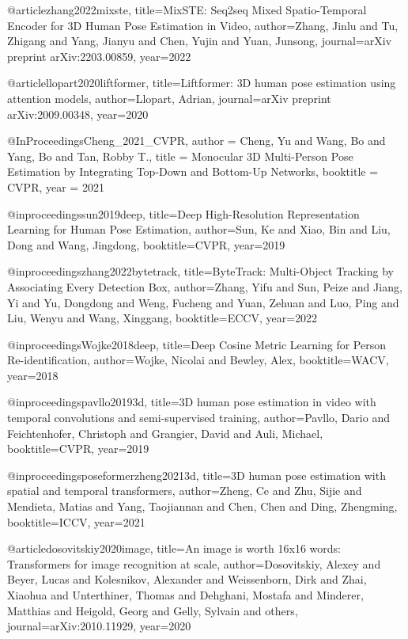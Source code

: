 @article{zhang2022mixste,
  title={MixSTE: Seq2seq Mixed Spatio-Temporal Encoder for {3D} Human Pose Estimation in Video},
  author={Zhang, Jinlu and Tu, Zhigang and Yang, Jianyu and Chen, Yujin and Yuan, Junsong},
  journal={arXiv preprint arXiv:2203.00859},
  year={2022}
}


@article{llopart2020liftformer,
  title={Liftformer: {3D} human pose estimation using attention models},
  author={Llopart, Adrian},
  journal={arXiv preprint arXiv:2009.00348},
  year={2020}
}

@InProceedings{Cheng_2021_CVPR,
    author    = {Cheng, Yu and Wang, Bo and Yang, Bo and Tan, Robby T.},
    title     = {Monocular {3D} Multi-Person Pose Estimation by Integrating Top-Down and Bottom-Up Networks},
    booktitle = CVPR,
    year      = {2021}
}

@inproceedings{sun2019deep,
  title={Deep High-Resolution Representation Learning for Human Pose Estimation},
  author={Sun, Ke and Xiao, Bin and Liu, Dong and Wang, Jingdong},
  booktitle=CVPR,
  year={2019}
}

@inproceedings{zhang2022bytetrack,
  title={Byte{T}rack: Multi-Object Tracking by Associating Every Detection Box},
  author={Zhang, Yifu and Sun, Peize and Jiang, Yi and Yu, Dongdong and Weng, Fucheng and Yuan, Zehuan and Luo, Ping and Liu, Wenyu and Wang, Xinggang},
  booktitle=ECCV,
  year={2022}
}

@inproceedings{Wojke2018deep,
  title={Deep Cosine Metric Learning for Person Re-identification},
  author={Wojke, Nicolai and Bewley, Alex},
  booktitle=WACV,
  year={2018}
}

@inproceedings{pavllo20193d,
  title={{3D} human pose estimation in video with temporal convolutions and semi-supervised training},
  author={Pavllo, Dario and Feichtenhofer, Christoph and Grangier, David and Auli, Michael},
  booktitle=CVPR,
  year={2019}
}

@inproceedings{poseformerzheng20213d,
  title={{3D} human pose estimation with spatial and temporal transformers},
  author={Zheng, Ce and Zhu, Sijie and Mendieta, Matias and Yang, Taojiannan and Chen, Chen and Ding, Zhengming},
  booktitle=ICCV,
  year={2021}
}

@article{dosovitskiy2020image,
  title={An image is worth 16x16 words: Transformers for image recognition at scale},
  author={Dosovitskiy, Alexey and Beyer, Lucas and Kolesnikov, Alexander and Weissenborn, Dirk and Zhai, Xiaohua and Unterthiner, Thomas and Dehghani, Mostafa and Minderer, Matthias and Heigold, Georg and Gelly, Sylvain and others},
  journal={arXiv:2010.11929},
  year={2020}
}

